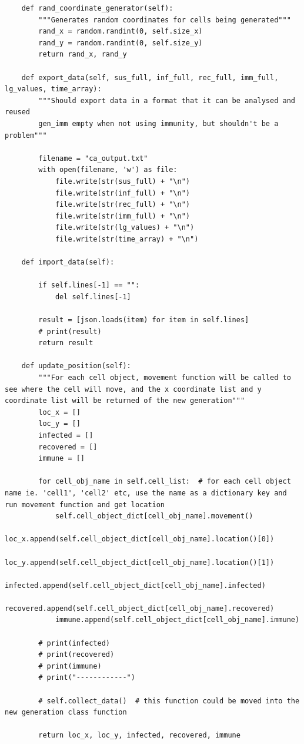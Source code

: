\documentclass[11pt, a4paper]{article}
\begin{document}
\begin{lstlisting}
    def rand_coordinate_generator(self):
        """Generates random coordinates for cells being generated"""
        rand_x = random.randint(0, self.size_x)
        rand_y = random.randint(0, self.size_y)
        return rand_x, rand_y

    def export_data(self, sus_full, inf_full, rec_full, imm_full, lg_values, time_array):
        """Should export data in a format that it can be analysed and reused
        gen_imm empty when not using immunity, but shouldn't be a problem"""

        filename = "ca_output.txt"
        with open(filename, 'w') as file:
            file.write(str(sus_full) + "\n")
            file.write(str(inf_full) + "\n")
            file.write(str(rec_full) + "\n")
            file.write(str(imm_full) + "\n")
            file.write(str(lg_values) + "\n")
            file.write(str(time_array) + "\n")

    def import_data(self):

        if self.lines[-1] == "":
            del self.lines[-1]

        result = [json.loads(item) for item in self.lines]
        # print(result)
        return result

    def update_position(self):
        """For each cell object, movement function will be called to see where the cell will move, and the x coordinate list and y coordinate list will be returned of the new generation"""
        loc_x = []
        loc_y = []
        infected = []
        recovered = []
        immune = []

        for cell_obj_name in self.cell_list:  # for each cell object name ie. 'cell1', 'cell2' etc, use the name as a dictionary key and run movement function and get location
            self.cell_object_dict[cell_obj_name].movement()
            loc_x.append(self.cell_object_dict[cell_obj_name].location()[0])
            loc_y.append(self.cell_object_dict[cell_obj_name].location()[1])
            infected.append(self.cell_object_dict[cell_obj_name].infected)
            recovered.append(self.cell_object_dict[cell_obj_name].recovered)
            immune.append(self.cell_object_dict[cell_obj_name].immune)

        # print(infected)
        # print(recovered)
        # print(immune)
        # print("------------")

        # self.collect_data()  # this function could be moved into the new generation class function

        return loc_x, loc_y, infected, recovered, immune


\end{lstlisting}
\end{document}
